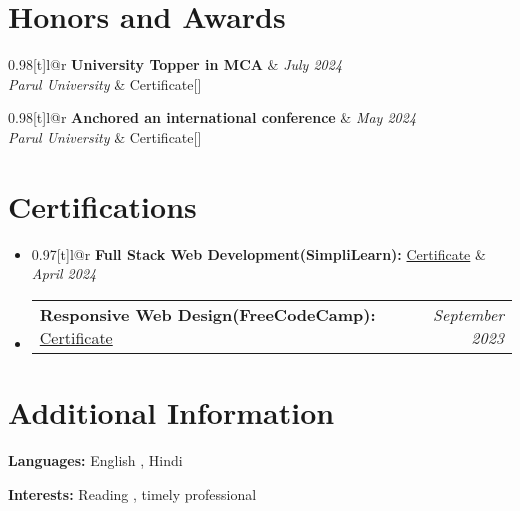 \documentclass[a4paper,11pt]{article}
\makeatletter
\newcommand{\resumePOR}[3]{
\vspace{0.5mm}\item
    \begin{tabular*}{0.97\textwidth}[t]{l@{\extracolsep{\fill}}r}
        \textbf{#1}\hspace{0.3mm}#2 & \textit{\small{#3}} 
    \end{tabular*}
    \vspace{-2mm}
}
\newcommand{\resumeProject}[4]{
\vspace{0.5mm}\item
    \begin{tabular*}{0.98\textwidth}[t]{l@{\extracolsep{\fill}}r}
        \textbf{#1} & \textit{\footnotesize{#3}} \\
        \footnotesize{\textit{#2}} & \footnotesize{#4}
    \end{tabular*}
    \vspace{-2.4mm}
}
\newcommand{\resumeSubHeadingListStart}{\begin{itemize}[leftmargin=*,labelsep=1mm]}
\newcommand{\resumeSubHeadingListEnd}{\end{itemize}\vspace{2mm}}
\makeatother
\begin{document}
\section{\textbf{Honors and Awards}}
\vspace{-2mm}
\resumeProject
  {University Topper in MCA}
  {Parul University}
  {July 2024}
  {{Certificate}[\href{https://www.linkedin.com/posts/jagrati-mehta-4b87b7213_chapter-semester-3rd-activity-7221510535148650496-eTXw?utm_source=share&utm_medium=member_desktop}{\textcolor{darkblue}{}}]}
\resumeProject
  {Anchored an international conference }
  {Parul University}
  { May 2024}
  {{Certificate}[\href{https://www.linkedin.com/posts/jagrati-mehta-4b87b7213_gratitude-mentorship-education-activity-7179881136624463872-Kzdf?utm_source=share&utm_medium=member_desktop}{\textcolor{darkblue}{\faIcon{globe}}}]}
\vspace{-2mm}

\section{\textbf{Certifications}}
\vspace{-0.4mm}
\resumeSubHeadingListStart
\resumePOR{}{
\textbf{Full Stack Web Development(SimpliLearn):} {{\href{https://www.linkedin.com/posts/jagrati-mehta-4b87b7213_jagrati-mehta-has-successfully-completed-activity-7184382491061874689-I0qa?utm_source=share&utm_medium=member_desktop}{Certificate}}}}{April 2024}
\resumePOR{}{
\textbf{Responsive Web Design(FreeCodeCamp):} {{\href{https://www.freecodecamp.org/certification/jagrati210/responsive-web-design}{Certificate}}}}{September 2023}

\resumeSubHeadingListEnd
\vspace{-6mm}

\section{\textbf{Additional Information}}
\vspace{-0.4mm}
\small{
\textbf{Languages:} English , Hindi 

\textbf{Interests:} Reading , timely professional

}
\vspace{-4mm}
\end{document}
